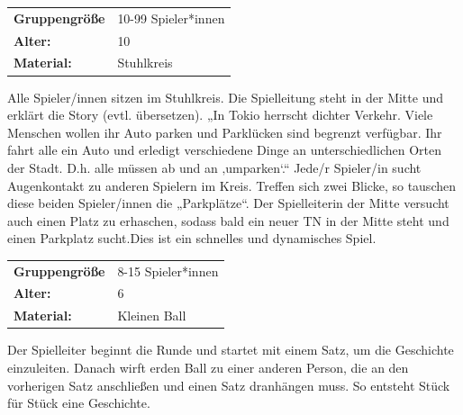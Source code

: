 
\newpage

\begin{table}[H]
\begin{tabular}{>{\bfseries}lp{8cm}}
   Gruppengröße   & 10-99 Spieler*innen\\
    Alter: & 10 \\
    Material: & Stuhlkreis\\
\end{tabular}
\end{table} 

 Alle Spieler/innen sitzen im Stuhlkreis. Die Spielleitung steht in der Mitte und erklärt die Story (evtl. übersetzen). „In Tokio herrscht dichter Verkehr. Viele Menschen wollen ihr Auto parken und Parklücken sind begrenzt verfügbar. Ihr fahrt alle ein Auto und erledigt verschiedene Dinge an unterschiedlichen Orten der Stadt. D.h. alle müssen ab und an ‚umparken‘.“ Jede/r Spieler/in sucht Augenkontakt zu anderen Spielern im Kreis. Treffen sich zwei Blicke, so tauschen diese beiden Spieler/innen die „Parkplätze“. Der Spielleiterin der Mitte versucht auch einen Platz zu erhaschen, sodass bald ein neuer TN in der Mitte steht und einen Parkplatz sucht.Dies ist ein schnelles und dynamisches Spiel.\\




\begin{table}[H]
\begin{tabular}{>{\bfseries}lp{8cm}}
   Gruppengröße   & 8-15 Spieler*innen\\
    Alter: & 6 \\
    Material: &Kleinen Ball \\
\end{tabular}
\end{table} 

 Der Spielleiter beginnt die Runde und startet mit einem Satz, um die Geschichte einzuleiten. Danach wirft erden Ball zu einer anderen Person, die an den vorherigen Satz anschließen und einen Satz dranhängen muss. So entsteht Stück für Stück eine Geschichte.\\



